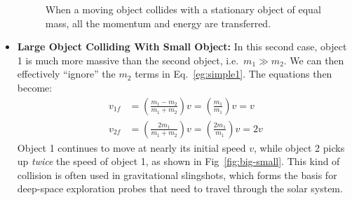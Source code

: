 \documentclass{../../oss-handout}
\begin{document}
\begin{itemize}[leftmargin=15pt]
\begin{figure}[ht]
    \caption{When a moving object collides with a stationary object of equal
      mass, all the momentum and energy are transferred.}
    \label{fig:same-mass}
  \end{figure}
\item\textbf{Large Object Colliding With Small Object:} In this second case,
  object 1 is much more massive than the second object, i.e.\ $m_1\gg m_2$. We
  can then effectively ``ignore'' the $m_2$ terms in Eq.~\ref{eg:simple1}. The
  equations then become:
  \begin{align*}
    v_{1f}&=\left(\frac{m_1-m_2}{m_1+m_2}\right)v=\left(\frac{m_1}{m_1}\right)v
    =v\\
    v_{2f}&=\left(\frac{2m_1}{m_1+m_2}\right)v=\left(\frac{2m_1}{m_1}\right)v=2v
  \end{align*}
  Object 1 continues to move at nearly its initial speed $v$, while object 2
  picks up \emph{twice} the speed of object 1, as shown in
  Fig~\ref{fig:big-small}. This kind of collision is often used in
  gravitational slingshots, which forms the basis for deep-space exploration
  probes that need to travel through the solar system.
  \begin{figure}[ht]
    \centering
\end{figure}
\end{itemize}
\end{document}
